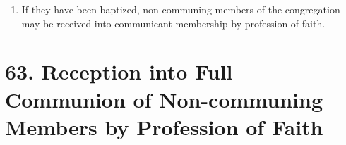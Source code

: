 \documentclass[
]{book}
\providecommand{\tightlist}{%
  \setlength{\itemsep}{0pt}\setlength{\parskip}{0pt}}
\begin{document}
\begin{enumerate}
\def\labelenumi{\arabic{enumi}.}
\setcounter{enumi}{5}
\tightlist
\item
  If they have been baptized, non-communing members of the congregation may be received into communicant membership by profession of faith.
\end{enumerate}

\hypertarget{reception-into-full-communion-of-non-communing-members-by-profession-of-faith}{%
\section*{63. Reception into Full Communion of Non-communing Members by Profession of Faith}\label{reception-into-full-communion-of-non-communing-members-by-profession-of-faith}}

\protect\hypertarget{chapter-slug-63-reception-into-full-communion-of-non-communing-members-by-profession-of-faith}{\href{}{}}
\end{document}
